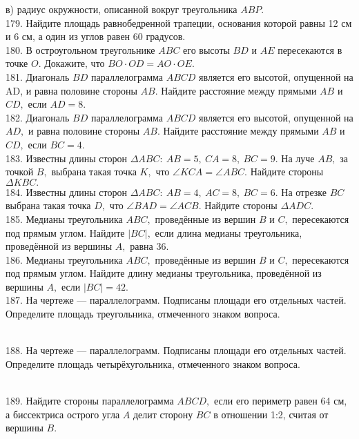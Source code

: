 в) радиус окружности, описанной вокруг треугольника $ABP.$\\
179. Найдите площадь равнобедренной трапеции, основания которой равны 12 см и 6 см, а один из углов равен 60 градусов.\\
180. В остроугольном треугольнике $ABC$ его высоты $BD$ и $AE$ пересекаются в точке $O.$ Докажите, что $BO\cdot OD=AO\cdot OE.$\\
181. Диагональ $BD$ параллелограмма $ABCD$ является его высотой, опущенной на AD, и равна половине стороны $AB.$ Найдите расстояние между прямыми $AB$ и $CD,$ если $AD = 8.$\\
182. Диагональ $BD$ параллелограмма $ABCD$ является его высотой, опущенной на $AD,$ и равна половине стороны $AB.$ Найдите расстояние между прямыми $AB$ и $CD,$ если $BC = 4.$\\
183. Известны длины сторон $\Delta ABC:\ AB = 5,\ CA = 8,\  BC = 9.$ На луче $AB,$ за точкой $B,$ выбрана такая точка $K,$ что $\angle KCA = \angle ABC.$ Найдите стороны $\Delta KBC.$\\
184. Известны длины сторон $\Delta ABC:\ AB = 4,\ AC = 8,\  BC = 6.$ На отрезке $BC$ выбрана такая точка $D,$ что $\angle BAD = \angle ACB.$ Найдите стороны $\Delta ADC.$\\
185. Медианы треугольника $ABC,$ проведённые из вершин $B$ и $C,$ пересекаются под прямым углом. Найдите $|BC|,$ если длина медианы треугольника, проведённой из вершины $A,$ равна 36.\\
186. Медианы треугольника $ABC,$ проведённые из вершин $B$ и $C,$ пересекаются под прямым углом. Найдите длину медианы треугольника, проведённой из вершины $A,$ если $|BC| = 42.$\\
187. На чертеже --- параллелограмм. Подписаны площади его отдельных частей. Определите площадь треугольника, отмеченного знаком вопроса.
\begin{figure}[ht!]
\end{figure}\\
188. На чертеже --- параллелограмм. Подписаны площади его отдельных частей. Определите площадь четырёхугольника, отмеченного знаком вопроса.
\begin{figure}[ht!]
\end{figure}\\
189. Найдите стороны параллелограмма $ABCD,$ если его периметр равен 64 см, а биссектриса острого угла $A$ делит сторону $BC$ в отношении 1:2, считая от вершины $B.$\\
